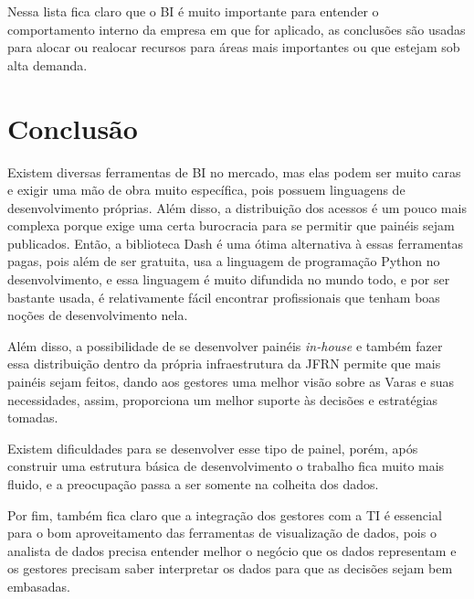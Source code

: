 Nessa lista fica claro que o BI é muito importante para entender o comportamento interno da empresa em que for aplicado, as conclusões são usadas para alocar ou realocar recursos para áreas mais importantes ou que estejam sob alta demanda.



%






\chapter{Conclusão}

Existem diversas ferramentas de BI no mercado, mas elas podem ser muito caras e exigir uma mão de obra muito específica, pois possuem linguagens de desenvolvimento próprias. Além disso, a distribuição dos acessos é um pouco mais complexa porque exige uma certa burocracia para se permitir que painéis sejam publicados. Então, a biblioteca Dash é uma ótima alternativa à essas ferramentas pagas, pois além de ser gratuita, usa a linguagem de programação Python no desenvolvimento, e essa linguagem é muito difundida no mundo todo, e por ser bastante usada, é relativamente fácil encontrar profissionais que tenham boas noções de desenvolvimento nela. 

Além disso, a possibilidade de se desenvolver painéis \textit{in-house} e também fazer essa distribuição dentro da própria infraestrutura da JFRN permite que mais painéis sejam feitos, dando aos gestores uma melhor visão sobre as Varas e suas necessidades, assim, proporciona um melhor suporte às decisões e estratégias tomadas. 

Existem dificuldades para se desenvolver esse tipo de painel, porém, após construir uma estrutura básica de desenvolvimento o trabalho fica muito mais fluido, e a preocupação passa a ser somente na colheita dos dados. 

Por fim, também fica claro que a integração dos gestores com a TI é essencial para o bom aproveitamento das ferramentas de visualização de dados, pois o analista de dados precisa entender melhor o negócio que os dados representam e os gestores precisam saber interpretar os dados para que as decisões sejam bem embasadas.